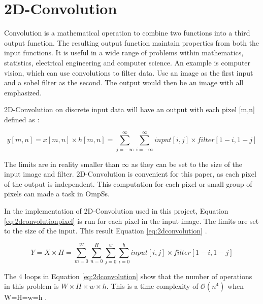\section{2D-Convolution}
Convolution is a mathematical operation to combine two functions into a third output function.
The resulting output function maintain properties from both the input functions.
It is useful in a wide range of problems within mathematics, statistics, electrical engineering and computer science.
An example is computer vision, which can use convolutions to filter data.
Use an image as the first input and a sobel filter as the second.
The output would then be an image with all emphasized.

2D-Convolution on discrete input data will have an output with each pixel [m,n] defined as \cite{lillesand13}:

\begin{equation} \label{eq:2dconvolutionpixel}
  y[m,n] = x[m,n] \times h[m,n] = \sum\limits_{j=-\infty}^\infty \sum\limits_{i=-\infty}^\infty input[i,j] \times filter[1-i, 1-j]
\end{equation}

The limits are in reality smaller than $\infty$ as they can be set to the size of the input image and filter.
2D-Convolution is convenient for this paper, as each pixel of the output is independent.
This computation for each pixel or small group of pixels can made a task in OmpSs.

In the implementation of 2D-Convolution used in this project, Equation \ref{eq:2dconvolutionpixel} is run for each pixel in the input image.
The limits are set to the size of the input.
This result Equation \ref{eq:2dconvolution} \cite{lillesand13}.

\begin{equation} \label{eq:2dconvolution}
  Y = X \times H = \sum\limits_{m=0}^W \sum\limits_{n=0}^H \sum\limits_{j=0}^{w} \sum\limits_{i=0}^{h} input[i,j] \times filter[1-i, 1-j]
\end{equation}

The 4 loops in Equation \ref{eq:2dconvolution} show that the number of operations in this problem is $W\times H\times w\times h$.
This is a time complexity of $\mathcal{O}(n^4)$ when W=H=w=h \cite{burger09}.

